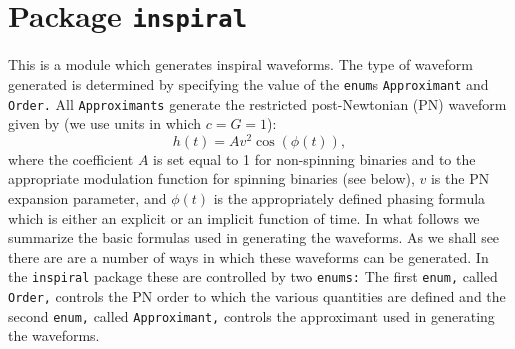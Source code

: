 \chapter{Package \texttt{inspiral}}

This is a module which generates inspiral waveforms. The type of waveform generated
is determined by specifying the value of the {\tt enum}s {\tt Approximant} and {\tt Order.}
All {\tt Approximants} generate the restricted post-Newtonian (PN) waveform given by (we
use units in which $c=G=1$):
\begin{equation}
h(t) = A v^2 \cos(\phi(t)),
\end{equation}
where the coefficient $A$ is set equal to 1 for non-spinning binaries 
and to the appropriate modulation function for spinning binaries (see below), 
$v$ is the PN expansion parameter, and $\phi(t)$ is the appropriately 
defined phasing formula which is either an explicit or an implicit 
function of time.  In what follows we summarize the basic formulas used
in generating the waveforms. As we shall see there are are a number of
ways in which these waveforms can be generated.  In the {\tt inspiral} package
these are controlled by two {\tt enums:} The first {\tt enum,} called {\tt Order,} 
controls the PN order to which the various quantities are defined and
the second {\tt enum,} called {\tt Approximant,} controls the approximant used
in generating the waveforms.
 
